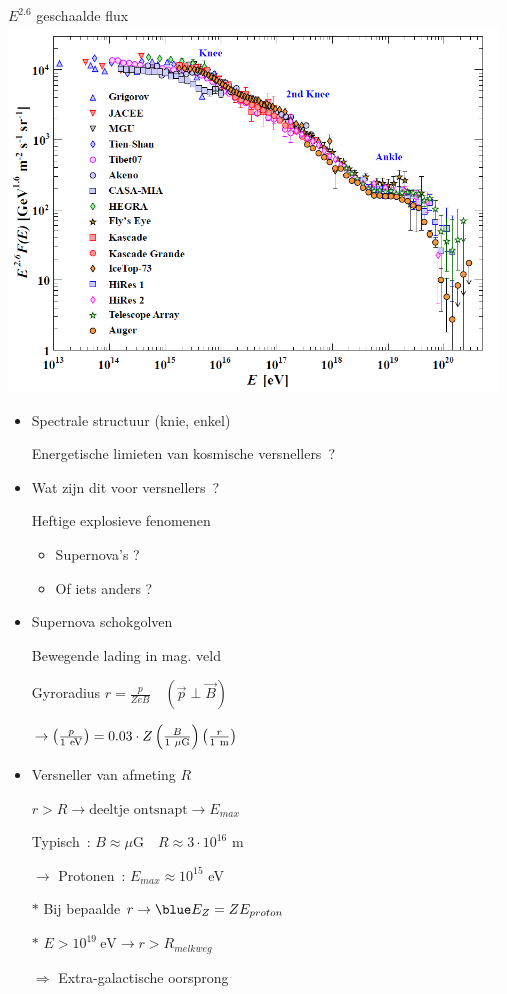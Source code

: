 \Tr
\vspace*{1.5cm}
\begin{center}
{\blue $E^{2.6}$ geschaalde flux}\\[5mm]
\includegraphics[keepaspectratio,width=13cm]{cr-all-scaled26}
\end{center}

\newpage

\vspace*{3cm}
\begin{itemize}
\item Spectrale structuur (knie, enkel)
\item[] Energetische limieten van kosmische versnellers~?
\item Wat zijn dit voor versnellers~?
\item[] Heftige explosieve fenomenen
\begin{itemize}
\item Supernova's ?
\item Of iets anders ?
\end{itemize}
\end{itemize}

\Tr
\begin{itemize}
\item Supernova schokgolven
\item[] Bewegende lading in mag. veld
\item[] Gyroradius $r=\frac{p}{ZeB} \quad (\vec{p} \perp \vec{B})$
\item[] $\rightarrow
         \left(\frac{p}{1~\rm{eV}}\right)=0.03 \cdot Z\left(\frac{B}{1~\mu\rm{G}}\right)
         \left(\frac{r}{1~\rm{m}}\right)$
\item Versneller van afmeting $R$
\item[] $r > R \rightarrow \text{deeltje~ontsnapt} \rightarrow E_{max}$
\item[] Typisch~: $B \approx \mu\text{G} \quad R \approx 3 \cdot 10^{16}$ m
\item[] $\rightarrow$ Protonen~: $E_{max} \approx 10^{15}$ eV
\item[$\ast$] Bij bepaalde $r \rightarrow {\blue E_{Z}=Z E_{proton}}$
\item[$\ast$] $E>10^{19}~\text{eV} \rightarrow r>R_{melkweg}$
\item[] $\Rightarrow$ Extra-galactische oorsprong
\end{itemize}

